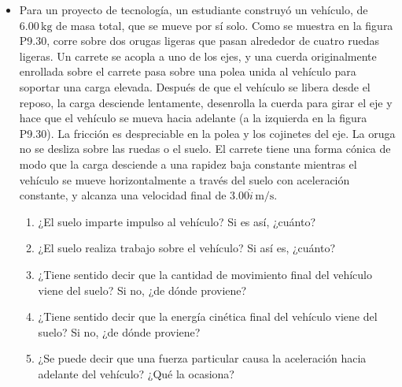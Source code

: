 \documentclass[11pt,a4paper]{article}
\begin{document}
\begin{itemize}
    \item[\textbf{30.}] Para un proyecto de tecnología, un estudiante construyó un vehículo, de \(6.00\,\text{kg}\) de masa total, que se mueve por sí solo. Como se muestra en la figura P9.30, corre sobre dos orugas ligeras que pasan alrededor de cuatro ruedas ligeras. Un carrete se acopla a uno de los ejes, y una cuerda originalmente enrollada sobre el carrete pasa sobre una polea unida al vehículo para soportar una carga elevada. Después de que el vehículo se libera desde el reposo, la carga desciende lentamente, desenrolla la cuerda para girar el eje y hace que el vehículo se mueva hacia adelante (a la izquierda en la figura P9.30). La fricción es despreciable en la polea y los cojinetes del eje. La oruga no se desliza sobre las ruedas o el suelo. El carrete tiene una forma cónica de modo que la carga desciende a una rapidez baja constante mientras el vehículo se mueve horizontalmente a través del suelo con aceleración constante, y alcanza una velocidad final de \(3.00\hat{i}\,\text{m/s}\).
    \begin{enumerate}
        \item ¿El suelo imparte impulso al vehículo? Si es así, ¿cuánto?
        \item ¿El suelo realiza trabajo sobre el vehículo? Si así es, ¿cuánto?
        \item ¿Tiene sentido decir que la cantidad de movimiento final del vehículo viene del suelo? Si no, ¿de dónde proviene?
        \item ¿Tiene sentido decir que la energía cinética final del vehículo viene del suelo? Si no, ¿de dónde proviene?
        \item ¿Se puede decir que una fuerza particular causa la aceleración hacia adelante del vehículo? ¿Qué la ocasiona?
    \end{enumerate}
    \vspace*{9cm}
\end{itemize}

\newpage
\end{document}
